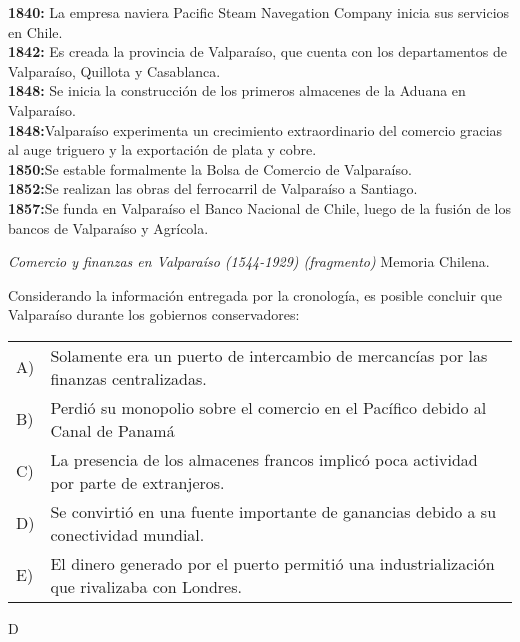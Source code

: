 \documentclass[letterpaper,11pt]{article}
\newcommand{\anchopregunta}{0.9\textwidth}
\begin{document}
\begin{enumerate}
\begin{minipage}{\anchopregunta}
\item \textbf{1840:}
La empresa naviera Pacific Steam Navegation Company inicia sus servicios en Chile.\\
\textbf{1842:}
Es creada la provincia de Valparaíso, que cuenta con los departamentos de Valparaíso, Quillota y Casablanca.\\
\textbf{1848:}
Se inicia la construcción de los primeros almacenes de la Aduana en Valparaíso.\\
\textbf{1848:}Valparaíso experimenta un crecimiento extraordinario del comercio gracias al auge triguero y la exportación de plata y cobre.\\
\textbf{1850:}Se estable formalmente la Bolsa de Comercio de Valparaíso.\\
\textbf{1852:}Se realizan las obras del ferrocarril de Valparaíso a Santiago.\\
\textbf{1857:}Se funda en Valparaíso el Banco Nacional de Chile, luego de la fusión de los bancos de Valparaíso y Agrícola.\\
\begin{flushright}
\textit{Comercio y finanzas en Valparaíso (1544-1929) (fragmento)} Memoria Chilena.
\end{flushright}
Considerando la información entregada por la cronología, es posible concluir que Valparaíso durante los gobiernos conservadores: 
\begin{flushleft}\begin{tabular}{@{\hspace{-.001\textwidth}}l@{\hspace{2pt}}p{}}
A)& Solamente era un puerto de intercambio de mercancías por las finanzas centralizadas.\\
B)& Perdió su monopolio sobre el comercio en el Pacífico debido al Canal de Panamá\\
C)& La presencia de los almacenes francos implicó poca actividad por parte de extranjeros.\\
D)& Se convirtió en una fuente importante de ganancias debido a su conectividad mundial.\\
E)& El dinero generado por el puerto permitió una industrialización que rivalizaba con Londres.\\ 
\end{tabular}\end{flushleft}%
\begin{key} D
\end{key} 

\end{minipage}
\end{enumerate}
\end{document}

